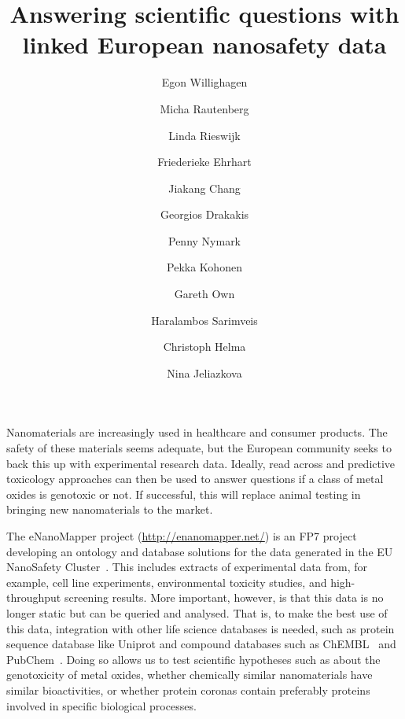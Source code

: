 \documentclass{llncs}
\begin{document}
\title{Answering scientific questions with linked European nanosafety data}

\author{
  Egon Willighagen \and
  Micha Rautenberg \and
  Linda Rieswijk \and
  Friederieke Ehrhart \and
  Jiakang Chang \and
  Georgios Drakakis \and
  Penny Nymark \and
  Pekka Kohonen \and
  Gareth Own \and
  Haralambos Sarimveis \and
  Christoph Helma \and
  Nina Jeliazkova
}


\maketitle

Nanomaterials are increasingly used in healthcare and consumer products. The 
safety of these materials seems adequate, but the European community seeks to 
back this up with experimental research data. Ideally, read across and 
predictive toxicology approaches can then be used to answer questions if a class 
of metal oxides is genotoxic or not. If successful, this will replace animal 
testing in bringing new nanomaterials to the market.

The eNanoMapper project (\url{http://enanomapper.net/}) is an FP7 project developing
an ontology and database  solutions for the data generated in the EU NanoSafety
Cluster~\cite{Hastings2015,Jeliazkova2015}. This
includes extracts of experimental data from, for example, cell line experiments, 
environmental toxicity studies, and high-throughput screening results. More 
important, however, is that this data is no longer static but can be queried and 
analysed. That is, to make the best use of this data, integration with other 
life science databases is needed, such as protein sequence database like Uniprot 
and compound databases such as ChEMBL~\cite{Willighagen2013} and
PubChem~\cite{Fu2015}. Doing so allows us to 
test scientific hypotheses such as about the genotoxicity of metal oxides, 
whether chemically similar nanomaterials have similar bioactivities, or whether 
protein coronas contain preferably proteins involved in specific biological 
processes.
\end{document}

